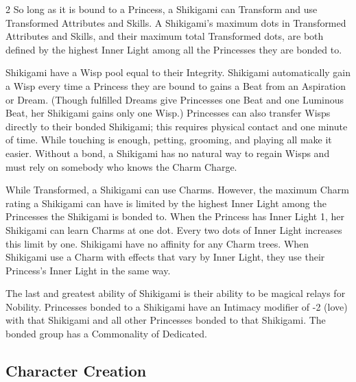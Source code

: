 \begin{multicols}{2}
So long as it is bound to a Princess, a Shikigami can Transform and use Transformed Attributes and Skills. A Shikigami's maximum dots in Transformed Attributes and Skills, and their maximum total Transformed dots, are both defined by the highest Inner Light among all the Princesses they are bonded to.

Shikigami have a Wisp pool equal to their Integrity. Shikigami automatically gain a Wisp every time a Princess they are bound to gains a Beat from an Aspiration or Dream. (Though fulfilled Dreams give Princesses one Beat and one Luminous Beat, her Shikigami gains only one Wisp.) Princesses can also transfer Wisps directly to their bonded Shikigami; this requires physical contact and one minute of time. While touching is enough, petting, grooming, and playing all make it easier. Without a bond, a Shikigami has no natural way to regain Wisps and must rely on somebody who knows the Charm Charge. 


While Transformed, a Shikigami can use Charms. However, the maximum Charm rating a Shikigami can have is limited by the highest Inner Light among the Princesses the Shikigami is bonded to. When the Princess has Inner Light 1, her Shikigami can learn Charms at one dot. Every two dots of Inner Light increases this limit by one. Shikigami have no affinity for any Charm trees. When Shikigami use a Charm with effects that vary by Inner Light, they use their Princess's Inner Light in the same way. 

The last and greatest ability of Shikigami is their ability to be magical relays for Nobility. Princesses bonded to a Shikigami have an Intimacy modifier of -2 (love) with that Shikigami and all other Princesses bonded to that Shikigami. The bonded group has a Commonality of Dedicated.

\subsection*{Character Creation}


\end{multicols}
